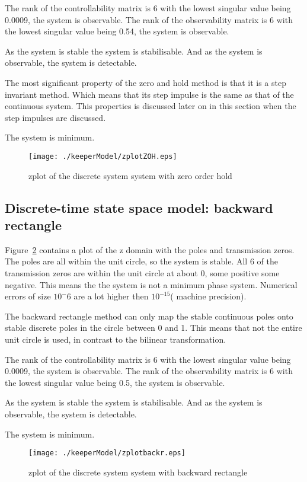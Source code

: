 The rank of the controllability matrix is 6 with the lowest singular value being 0.0009, the system is observable. The rank of the observability matrix is 6 with the lowest singular value being 0.54, the system is observable.

As the system is stable  the system is stabilisable. And as the system is observable, the system is detectable.

The most significant property of the zero and hold method is that it is a step invariant method. Which means that its step impulse is the same as that of the continuous system. This properties is discussed later on in this section when the step impulses are discussed.

The system is minimum.

\begin{figure}[H]
	\centering
	\texttt{[image: ./keeperModel/zplotZOH.eps]}
	\caption{zplot of the discrete system system with zero order hold}
	\label{fig:zplot zoh}
\end{figure}

\subsection{Discrete-time state space model: backward rectangle}
Figure~\ref{fig:zplot backr} contains a plot of the z domain with the poles and transmission zeros. The poles are all within the unit circle, so the system is stable. All 6 of the transmission zeros are within the unit circle at about 0, some positive some negative. This means the the system is not a minimum phase system. Numerical errors of size $10^-6$ are a lot higher then  $10^{-15}$( machine precision).

The backward rectangle method can only map the stable continuous poles onto stable discrete poles in the circle between 0 and 1. This means that not the entire unit circle is used, in contrast to the bilinear transformation.

The rank of the controllability matrix is 6 with the lowest singular value being 0.0009, the system is observable. The rank of the observability matrix is 6 with the lowest singular value being 0.5, the system is observable.

As the system is stable  the system is stabilisable. And as the system is observable, the system is detectable.

The system is minimum.

\begin{figure}[H]
	\centering
	\texttt{[image: ./keeperModel/zplotbackr.eps]}
	\caption{zplot of the discrete system system with backward rectangle}
	\label{fig:zplot backr}
\end{figure}

